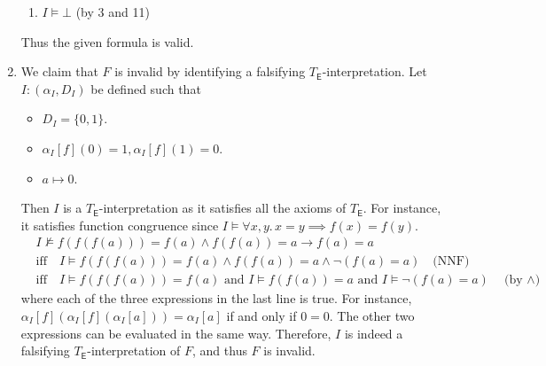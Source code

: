 \begin{exer}[3.1]
\begin{enumerate}[label=(\alph*)]
\begin{enumerate}[label=\arabic*.]
                \item %
                    $I \models \bot$ (by 3 and 11)
            \end{enumerate}
            Thus the given formula is valid.
        \item
            We claim that $F$ is invalid by identifying a falsifying $T_{\textsf{E}}$-interpretation.
            Let $I: (\alpha_I, D_I)$ be defined such that
            \begin{itemize}
                \item
                    $D_I = \{ 0, 1 \}$.
                \item
                    $\alpha_I[f](0) = 1, \alpha_I[f](1) = 0$.
                \item
                    $a \mapsto 0$.
            \end{itemize}
            Then $I$ is a $T_{\textsf{E}}$-interpretation as it satisfies all the axioms of $T_{\textsf{E}}$.
            For instance, it satisfies function congruence since $I \models \forall x, y.\, x = y \implies f(x) = f(y)$.
            \begin{align*}
                &I \not\models f(f(f(a))) = f(a) \land f(f(a)) = a \rightarrow f(a) = a \\
                &\text{iff}\quad I \models f(f(f(a))) = f(a) \land f(f(a)) = a \land \neg(f(a) = a) \quad\text{(NNF)}\\
                &\text{iff}\quad I \models f(f(f(a))) = f(a) \text{ and } I \models f(f(a)) = a \text{ and } I \models \neg(f(a) = a) \quad\text{(by $\land$)}
            \end{align*}
            where each of the three expressions in the last line is true.
            For instance, $\alpha_{I}[f](\alpha_I[f](\alpha_I[a])) = \alpha_I[a]$ if and only if $0 = 0$.
            The other two expressions can be evaluated in the same way.
            Therefore, $I$ is indeed a falsifying $T_{\textsf{E}}$-interpretation of $F$, and thus $F$ is invalid.
    \end{enumerate}
\end{exer}


